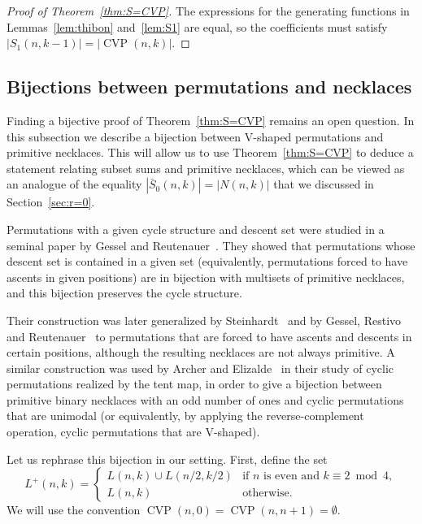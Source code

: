 \documentclass[12pt]{article}
\DeclareMathOperator{\CVP}{CVP}
\newcommand{\card}[1]{\left|#1\right|}
\newcommand{\bS}{\bar{S}}
\theoremstyle{definition}
\begin{document}
\begin{proof}[Proof of Theorem~\ref{thm:S=CVP}]
The expressions for the generating functions in Lemmas~\ref{lem:thibon} and~\ref{lem:S1} are equal, so the coefficients must satisfy $\card{S_1(n,k-1)}=\card{\CVP(n,k)}$.
\end{proof}

\subsection{Bijections between permutations and necklaces}

Finding a bijective proof of Theorem~\ref{thm:S=CVP} remains an open question. In this subsection we describe a bijection between V-shaped permutations and primitive necklaces. This will allow us to use Theorem~\ref{thm:S=CVP} to deduce a statement relating subset sums and primitive necklaces, which can be viewed as an analogue of the equality $\card{\bS_0(n,k)}=\card{N(n,k)}$ that we discussed in Section~\ref{sec:r=0}.

Permutations with a given cycle structure and descent set were studied in a seminal paper by Gessel and Reutenauer~\cite{GR}. They showed that permutations whose descent set is contained in a given set (equivalently, permutations forced to have ascents in given positions) are in bijection with multisets of primitive necklaces, and this bijection preserves the cycle structure.

Their construction was later generalized by Steinhardt~\cite{Ste} and by Gessel, Restivo and Reutenauer~\cite{GRR} to permutations that are forced to have ascents and descents in certain positions, although the resulting necklaces are not always primitive. A similar construction was used by Archer and Elizalde~\cite{ArcEli} in their study of cyclic permutations realized by the tent map, in order to give a bijection between primitive binary necklaces with an odd number of ones and cyclic permutations that are unimodal (or equivalently, by applying the reverse-complement operation, cyclic permutations that are V-shaped).

Let us rephrase this bijection in our setting. First, define the set
\begin{equation}\label{eq:L+} 
L^+(n,k)=\begin{cases} L(n,k)\cup L(n/2,k/2) & \text{if $n$ is even and $k\equiv 2\bmod 4$},\\ L(n,k) & \text{otherwise.}\end{cases}
\end{equation}
We will use the convention $\CVP(n,0)=\CVP(n,n+1)=\emptyset$.
\end{document}

